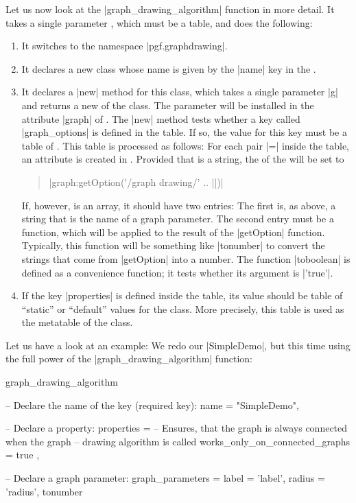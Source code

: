 Let us now look at the |graph_drawing_algorithm| function in more
detail. It takes a single parameter , which must be a
table, and does the following:

\begin{enumerate}
\item It switches to the namespace |pgf.graphdrawing|.
\item It declares a new class whose name is given by the |name| key in
  the .
\item It declares a |new| method for this class, which takes a single
  parameter |g| and returns a new  of the class. The
  parameter will be installed in the attribute |graph| of
  . The |new| method tests whether a key called
  |graph_options| is defined in the  table. If so, the
  value for this key must be a table of . This table is
  processed as follows: For each pair  |=| 
  inside the  table, an attribute  is created
  in . Provided that  is a string, the
   of the  will be set to
  \begin{quote}
    |graph:getOption('/graph drawing/' .. ||)|
  \end{quote}
  If, however,  is an array, it should have two entries:
  The first is, as above, a string that is the name of a graph
  parameter. The second entry must be a function, which will be
  applied to the result of the |getOption| function. Typically, this
  function will be something like |tonumber| to convert the strings
  that come from |getOption| into a number. The function |toboolean|
  is defined as a convenience function; it tests whether its argument
  is |'true'|.
\item If the key |properties| is defined inside the  table,
  its value should be table of ``static'' or ``default'' values for
  the class. More precisely, this table is used as the metatable of
  the class.
\end{enumerate}

Let us have a look at an example: We redo our |SimpleDemo|, but this
time using the full power of the |graph_drawing_algorithm| function:

\begin{codeexample}
graph_drawing_algorithm {
  
  -- Declare the name of the key (required key):
  name = "SimpleDemo",

  -- Declare a property:
  properties = {
    -- Ensures, that the graph is always connected when the graph
    -- drawing algorithm is called
    works_only_on_connected_graphs = true
  },

  -- Declare a graph parameter:
  graph_parameters = {
    label  = 'label',
    radius = {'radius', tonumber}
  }
}
\end{codeexample}

